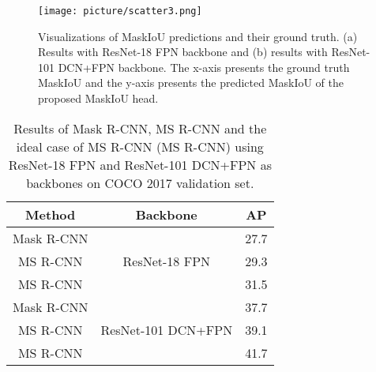 \documentclass[10pt,twocolumn,letterpaper]{article}
\begin{document}
    
\begin{figure}[!t]
\centering
\texttt{[image: picture/scatter3.png]}
\caption{Visualizations of MaskIoU predictions and their ground truth. (a) Results with ResNet-18 FPN backbone and (b) results with ResNet-101 DCN+FPN backbone. The x-axis presents the ground truth MaskIoU and the y-axis presents the predicted MaskIoU of the proposed MaskIoU head.}
\label{fig:scatter}
\end{figure}      
  
    
\begin{comment}
\begin{table}[ht!]
\caption{Upper limit results. We use ResNet-18 for experiments in COCO 2017 validation dataset. use gt IoU(\emph{thresh}) means if the ground truth MaskIoU is higher than \emph{thresh}, then use the ground truth MaskIoU to replace the predicting MaskIoU, otherwise, still using predicting MaskIoU. }
\vspace{3mm}
  \centering
\setlength{\tabcolsep}{3mm}
  {\begin{tabular}{c|c c c}
  \toprule
    Method & AP & AP@0.5 & AP@0.75 \\
    \midrule
    baseline & 27.7 & 46.9 & 29.0 \\
    predicted MaskIoU & 29.3 & 46.9 & 31.3 \\
    gt MaskIoU   & 31.5 & 48.4 & 34.2 \\
    \midrule
    baseline & 37.7 & 60.3 & 40.0 \\
    predicted MaskIoU & 39.1 & 60.0 & 42.4 \\
    gt MaskIoU  & 41.7 & 61.5 & 45.7 \\
    \bottomrule
  \end{tabular}}
  \label{table:upper_limit}
\end{table}
\end{comment}

\begin{table}
\caption{Results of Mask R-CNN, MS R-CNN and the ideal case of MS R-CNN (MS R-CNN) using ResNet-18 FPN and ResNet-101 DCN+FPN as backbones on COCO 2017 validation set.}
\vspace{3mm}
  \centering
\setlength{\tabcolsep}{3mm}
  {\begin{tabular}{c|c|c}
  \toprule
    Method & Backbone & AP\\
    \midrule
    Mask R-CNN & \multirow{3}{*}{ResNet-18 FPN} & 27.7  \\
    MS R-CNN && 29.3 \\
    MS R-CNN&   & 31.5  \\
    \midrule
    Mask R-CNN & \multirow{3}{*}{ResNet-101 DCN+FPN} & 37.7  \\
    MS R-CNN & & 39.1 \\
    MS R-CNN &  & 41.7  \\
    \bottomrule
  \end{tabular}}
  \label{table:upper_limit}
\end{table}
\end{document}
